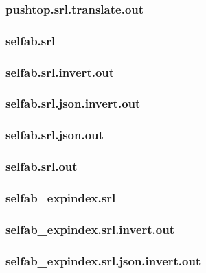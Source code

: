 \subsubsection{pushtop.srl.translate.out}
\label{app:pushtop_srl.translate.out}

\subsubsection{selfab.srl}
\label{app:selfab_srl}

\subsubsection{selfab.srl.invert.out}
\label{app:selfab_srl.invert.out}

\subsubsection{selfab.srl.json.invert.out}
\label{app:selfab_srl.json.invert.out}

\subsubsection{selfab.srl.json.out}
\label{app:selfab_srl.json.out}

\subsubsection{selfab.srl.out}
\label{app:selfab_srl.out}

\subsubsection{selfab\_expindex.srl}
\label{app:selfab_expindex_srl}

\subsubsection{selfab\_expindex.srl.invert.out}
\label{app:selfab_expindex_srl.invert.out}

\subsubsection{selfab\_expindex.srl.json.invert.out}
\label{app:selfab_expindex_srl.json.invert.out}

